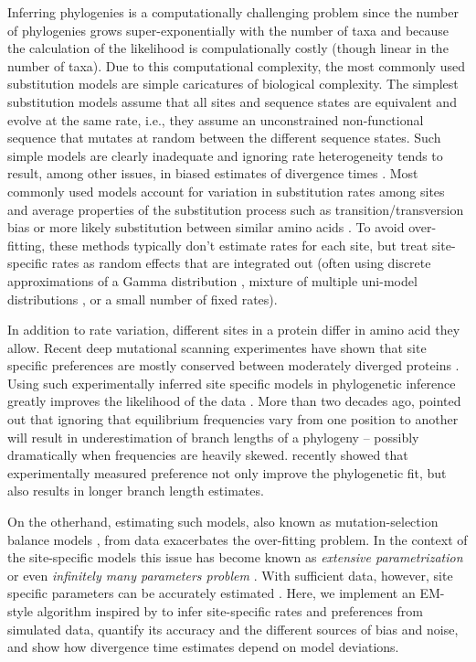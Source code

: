 \documentclass[aps,rmp,twocolumn]{revtex4}
\begin{document}
Inferring phylogenies is a computationally challenging problem since the number of phylogenies grows super-exponentially with the number of taxa and because the calculation of the likelihood is compulationally costly (though linear in the number of taxa).
Due to this computational complexity, the most commonly used substitution models are simple caricatures of biological complexity.
The simplest substitution models assume that all sites and sequence states are equivalent and evolve at the same rate, i.e., they assume an unconstrained non-functional sequence that mutates at random between the different sequence states.
Such simple models are clearly inadequate and ignoring rate heterogeneity tends to result, among other issues, in biased estimates of divergence times \citep{yang1996among}.
Most commonly used models account for variation in substitution rates among sites and average properties of the substitution process such as transition/transversion bias or more likely substitution between similar amino acids \citep{yang_maximum_1994,FastTree2,nguyen_iq-tree:_2015,stamatakis_raxml_2014}.
To avoid over-fitting, these methods typically don't estimate rates for each site, but treat site-specific rates as random effects that are integrated out (often using discrete approximations of a Gamma distribution \citep{yang1996among}, mixture of multiple uni-model distributions \citep{mayrose2005gamma}, or a small number of fixed rates).

In addition to rate variation, different sites in a protein differ in amino acid they allow.
Recent deep mutational scanning experimentes have shown that site specific preferences are mostly conserved between moderately diverged proteins \citep{doud_site-specific_2015}.
Using such experimentally inferred site specific models in phylogenetic inference greatly improves the likelihood of the data \cite{bloom2014experimentally}.
More than two decades ago, \citet{halpern_evolutionary_1998} pointed out that ignoring that equilibrium frequencies vary from one position to another will result in underestimation of branch lengths of a phylogeny -- possibly dramatically when frequencies are heavily skewed.
\citet{hilton_modeling_2018} recently showed that experimentally measured preference not only improve the phylogenetic fit, but also results in longer branch length estimates.

On the otherhand, estimating such models, also known as mutation-selection balance models \citep{bruno1996modeling,yang2008mutation}, from data exacerbates the over-fitting problem.
In the context of the site-specific models this issue has become known as {\em extensive parametrization} or even {\em infinitely many parameters problem} \cite{Rodrigue557,spielman2016extensively}.
With sufficient data, however, site specific parameters can be accurately estimated \citep{tamuri_estimating_2012,spielman2016extensively,scheffler2014validity}.
Here, we implement an EM-style algorithm inspired by \citep{bruno1996modeling} to infer site-specific rates and preferences from simulated data, quantify its accuracy and the different sources of bias and noise, and show how divergence time estimates depend on model deviations.
\end{document}
